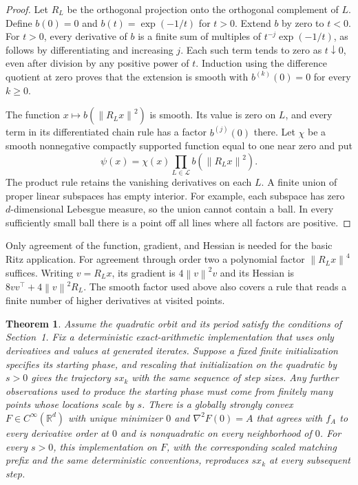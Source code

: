 \documentclass[11pt]{article}
\newtheorem{theorem}{Theorem}
\newcommand{\R}{\mathbb R}
\newcommand{\norm}[1]{\left\lVert#1\right\rVert}
\begin{document}
\begin{proof}
Let \(R_L\) be the orthogonal projection onto the orthogonal complement
of \(L\). Define \(b(0)=0\) and \(b(t)=\exp(-1/t)\) for \(t>0\).
Extend \(b\) by zero to \(t<0\). For \(t>0\), every derivative of \(b\)
is a finite sum of multiples of \(t^{-j}\exp(-1/t)\), as follows by
differentiating and increasing \(j\). Each such term tends to zero
as \(t\downarrow0\), even after division by any positive power of \(t\).
Induction using the difference quotient at zero proves that the
extension is smooth with \(b^{(k)}(0)=0\) for every \(k\ge0\).

The function \(x\mapsto b(\norm{R_Lx}^2)\) is smooth. Its value is
zero on \(L\), and every term in its differentiated chain rule has a
factor \(b^{(j)}(0)\) there. Let \(\chi\) be a smooth nonnegative
compactly supported function equal to one near zero and put
\[
 \psi(x)=\chi(x)\prod_{L\in\mathcal L} b(\norm{R_Lx}^2).
\]
The product rule retains the vanishing derivatives on each \(L\).
A finite union of proper linear subspaces has empty interior. For
example, each subspace has zero \(d\)-dimensional Lebesgue measure,
so the union cannot contain a ball. In every sufficiently small
ball there is a point off all lines where all factors are positive.
\end{proof}

Only agreement of the function, gradient, and Hessian is needed for
the basic Ritz application. For agreement through order two a
polynomial factor \(\norm{R_Lx}^4\) suffices. Writing \(v=R_Lx\), its
gradient is \(4\norm{v}^2v\) and its Hessian is
\(8vv^\top+4\norm{v}^2R_L\). The smooth factor used above also covers a
rule that reads a finite number of higher derivatives at visited
points.

\begin{theorem}\label{thm:lift}
Assume the quadratic orbit and its period satisfy the conditions
of Section~1. Fix a deterministic exact-arithmetic implementation
that uses only derivatives and values at generated iterates. Suppose a
fixed finite initialization specifies its starting phase, and
rescaling that initialization on the quadratic by \(s>0\) gives
the trajectory \(s x_k\) with the same sequence of step sizes.
Any further observations used to produce the starting phase must
come from finitely many points whose locations scale by \(s\). There is a globally strongly convex
\(F\in C^\infty(\R^d)\) with unique minimizer \(0\) and
\(\nabla^2 F(0)=A\) that agrees with \(f_A\) to every derivative order
at \(0\) and is nonquadratic on every neighborhood of \(0\). For
every \(s>0\), this implementation on \(F\), with the corresponding
scaled matching prefix and the same deterministic conventions,
reproduces \(s x_k\) at every subsequent step.
\end{theorem}
\end{document}

